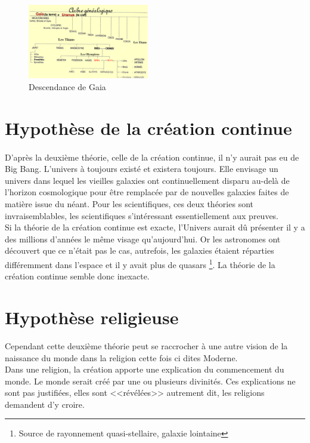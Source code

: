 \begin{figure}[h]
	\begin{center}
\includegraphics[width=200px]{img4.png}
\caption{Descendance de Gaia}
	\end{center}
\end{figure}

\section{Hypothèse de la création continue}
\paragraph{}
D'après la deuxième théorie, celle de la création continue, il n'y aurait pas eu
de Big Bang. L'univers à toujours existé et existera toujours. Elle envisage un
univers dans lequel les vieilles galaxies ont continuellement disparu au-delà de
l'horizon cosmologique pour être remplacée par de nouvelles galaxies faites de
matière issue du néant. Pour les scientifiques, ces deux théories sont 
invraisemblables, les scientifiques s'intéressant essentiellement 
aux preuves.\\
				  
Si la théorie de la création continue est exacte, l'Univers aurait dû présenter
il y a des millions d'années le même visage qu'aujourd'hui. Or les astronomes 
ont découvert que ce n'était pas le cas, autrefois, les galaxies étaient 
réparties différemment dans l'espace et il y avait plus de quasars
\footnote{Source de rayonnement quasi-stellaire, galaxie lointaine}. 
La théorie de la création continue semble donc inexacte. \\
	   
\section{Hypothèse religieuse}
Cependant cette deuxième théorie peut se raccrocher à une autre vision de la 
naissance du monde dans la religion cette fois ci dites Moderne.\\
Dans une religion, la création apporte une explication du commencement du monde. 
Le monde serait créé par une ou plusieurs divinités. Ces explications ne sont 
pas justifiées, elles sont <<révélées>> autrement dit, les religions demandent 
d'y croire. \\
		
